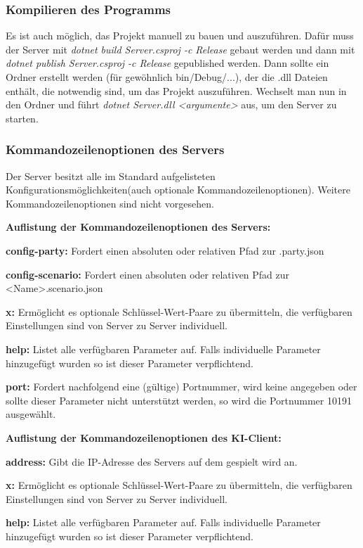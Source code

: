\documentclass[12pt]{article}
\begin{document}
\subsubsection{Kompilieren des Programms}
Es ist auch möglich, das Projekt manuell zu bauen und auszuführen. Dafür muss der Server mit \textit{dotnet build Server.csproj -c Release} gebaut werden und dann mit \textit{dotnet publish Server.csproj -c Release} gepublished
werden. Dann sollte ein Ordner erstellt werden (für gewöhnlich bin/Debug/...), der die .dll Dateien enthält, die notwendig sind, um das Projekt auszuführen.
Wechselt man nun in den Ordner und führt \textit{dotnet Server.dll <argumente>} aus, um den Server zu starten.

\subsubsection{Kommandozeilenoptionen des Servers}
Der Server besitzt alle im Standard aufgelisteten Konfigurationsmöglichkeiten(auch optionale Kommandozeilenoptionen). Weitere Kommandozeilenoptionen sind nicht vorgesehen.

\textbf{Auflistung der Kommandozeilenoptionen des Servers:}

\textbf{config-party:} Fordert einen absoluten oder relativen Pfad zur .party.json

\textbf{config-scenario:} Fordert einen absoluten oder relativen Pfad zur <Name>.scenario.json

\textbf{x:} Ermöglicht es optionale Schlüssel-Wert-Paare zu übermitteln, die verfügbaren Einstellungen sind von
Server zu Server individuell.

\textbf{help:} Listet alle verfügbaren Parameter auf. Falls individuelle Parameter hinzugefügt wurden so ist dieser Parameter verpflichtend.

\textbf{port:} Fordert nachfolgend eine (gültige) Portnummer, wird keine angegeben oder sollte dieser Parameter
nicht unterstützt werden, so wird die Portnummer 10191 ausgewählt.

\textbf{Auflistung der Kommandozeilenoptionen des KI-Client:}

\textbf{address:} Gibt die IP-Adresse des Servers auf dem gespielt wird an.

\textbf{x:} Ermöglicht es optionale Schlüssel-Wert-Paare zu übermitteln, die verfügbaren Einstellungen sind von
Server zu Server individuell.

\textbf{help:} Listet alle verfügbaren Parameter auf. Falls individuelle Parameter hinzugefügt wurden so ist dieser Parameter verpflichtend.
\end{document}
